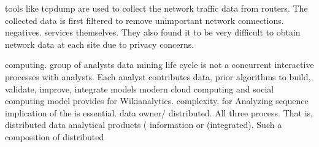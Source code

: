 \documentclass[times]{cpeauth}
\begin{document}
%
%
%
tools like tcpdump are used to collect the network traffic data from routers.
The collected data is first filtered to remove unimportant network connections.
%
%
negatives.
%
services themselves. They also found it to be very difficult to obtain network
data at each site due to privacy concerns.
%




%
%
computing.  %
group of analysts %
data mining life cycle is not a %
concurrent interactive processes with %
analysts.  Each analyst contributes data, prior %
algorithms to build, validate, improve, integrate models %
modern cloud computing and social computing model provides %
for Wikianalytics.
%
%
complexity.  %
for %
Analyzing %
sequence %
implication of the %
is essential.
%
data owner/ %
distributed.  All three %
process. That is, distributed data %
analytical products ( information or %
(integrated). Such a composition of distributed %
\end{document}
